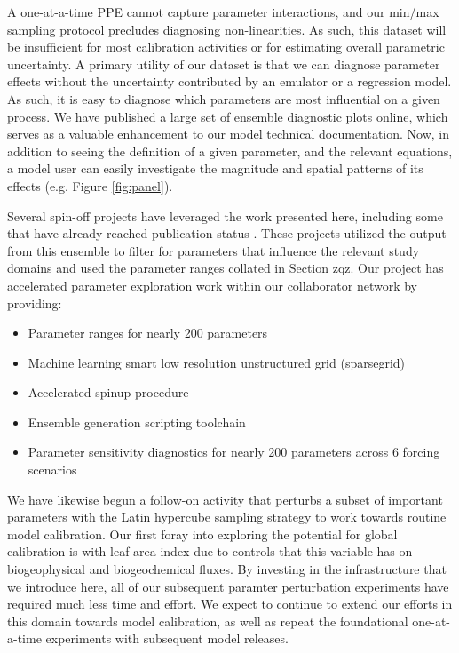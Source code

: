 \documentclass[draft]{agujournal2019}
\begin{document}
A one-at-a-time PPE cannot capture parameter interactions, and our min/max sampling protocol precludes diagnosing non-linearities. As such, this dataset will be insufficient for most calibration activities or for estimating overall parametric uncertainty. A primary utility of our dataset is that we can diagnose parameter effects without the uncertainty contributed by an emulator or a regression model. As such, it is easy to diagnose which parameters are most influential on a given process. We have published a large set of ensemble diagnostic plots online, which serves as a valuable enhancement to our model technical documentation. Now, in addition to seeing the definition of a given parameter, and the relevant equations, a model user can easily investigate the magnitude and spatial patterns of its effects (e.g. Figure \ref{fig:panel}).

Several spin-off projects have leveraged the work presented here, including some that have already reached publication status \cite{cheng2023,yan2023a,yan2023b}. These projects utilized the output from this ensemble to filter for parameters that influence the relevant study domains and used the parameter ranges collated in Section zqz. Our project has accelerated parameter exploration work within our collaborator network by providing:

\begin{itemize}
\item Parameter ranges for nearly 200 parameters
\item Machine learning smart low resolution unstructured grid (sparsegrid)
\item Accelerated spinup procedure
\item Ensemble generation scripting toolchain
\item Parameter sensitivity diagnostics for nearly 200 parameters across 6 forcing scenarios
\end{itemize} 

We have likewise begun a follow-on activity that perturbs a subset of important parameters with the Latin hypercube sampling strategy to work towards routine model calibration.  Our first foray into exploring the potential for global calibration is with leaf area index due to controls that this variable has on biogeophysical and biogeochemical fluxes. By investing in the infrastructure that we introduce here, all of our subsequent paramter perturbation experiments have required much less time and effort. We expect to continue to extend our efforts in this domain towards model calibration, as well as repeat the foundational one-at-a-time experiments with subsequent model releases.
\end{document}
